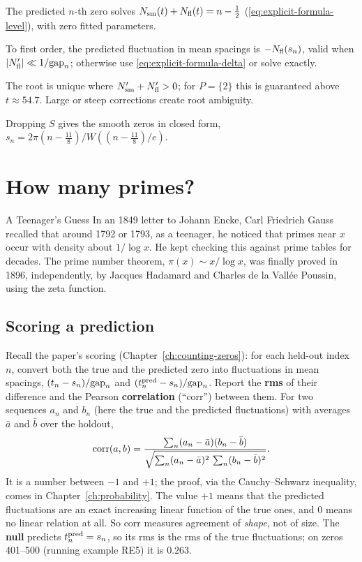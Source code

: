 \begin{keyideas}
\item The predicted $n$-th zero solves $N_{\mathrm{sm}}(t)+N_{\mathrm{fl}}(t)=n-\tfrac12$ (\cref{eq:explicit-formula-level}), with zero fitted parameters.
\item To first order, the predicted fluctuation in mean spacings is $-N_{\mathrm{fl}}(s_n)$, valid when $\left\lvert N_{\mathrm{fl}}'\right\rvert\ll1/\mathrm{gap}_n$; otherwise use \cref{eq:explicit-formula-delta} or solve exactly.
\item The root is unique where $N_{\mathrm{sm}}'+N_{\mathrm{fl}}'>0$; for $P=\{2\}$ this is guaranteed above $t\approx54.7$. Large or steep corrections create root ambiguity.
\item Dropping $S$ gives the smooth zeros in closed form, $s_n=2\pi(n-\frac{11}{8})/W((n-\frac{11}{8})/e)$.
\end{keyideas}

\section{How many primes?}\label{sec:explicit-formula-howmany}
\begin{didyouknow}{A Teenager's Guess}
In an 1849 letter to Johann Encke, Carl Friedrich Gauss recalled that around 1792 or 1793, as a teenager, he noticed that primes near $x$ occur with density about $1/\log x$. He kept checking this against prime tables for decades. The prime number theorem, $\pi(x)\sim x/\log x$, was finally proved in 1896, independently, by Jacques Hadamard and Charles de la Vall\'ee Poussin, using the zeta function.
\end{didyouknow}

\subsection{Scoring a prediction}

Recall the paper's scoring (Chapter~\ref{ch:counting-zeros}): for each held-out index $n$, convert both the true and the predicted zero into fluctuations in mean spacings, $(t_n-s_n)/\mathrm{gap}_n$ and $(t^{\rm pred}_n-s_n)/\mathrm{gap}_n$. Report the \textbf{rms} of their difference and the Pearson \textbf{correlation} (``corr'') between them. For two sequences $a_n$ and $b_n$ (here the true and the predicted fluctuations) with averages $\bar a$ and $\bar b$ over the holdout,
\begin{equation}
\mathrm{corr}(a,b)=\frac{\sum_n(a_n-\bar a)(b_n-\bar b)}{\sqrt{\sum_n(a_n-\bar a)^2\,\sum_n(b_n-\bar b)^2}} .
\label{eq:explicit-formula-corr}
\end{equation}
It is a number between $-1$ and $+1$; the proof, via the Cauchy--Schwarz inequality, comes in Chapter~\ref{ch:probability}. The value $+1$ means that the predicted fluctuations are an exact increasing linear function of the true ones, and $0$ means no linear relation at all. So corr measures agreement of \emph{shape}, not of size. The \textbf{null} predicts $t^{\rm pred}_n=s_n$, so its rms is the rms of the true fluctuations; on zeros 401--500 (running example RE5) it is $0.263$.

